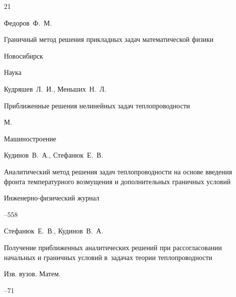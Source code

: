\begin{thebibliography}{21}

\by Федоров~Ф.~М.

\book Граничный метод решения прикладных задач математической физики

\publaddr Новосибирск

\publ Наука







\by Кудряшев~Л.~И., Меньших~Н.~Л.

\book Приближенные решения нелинейных задач теплопроводности

\publaddr М.

\publ Машиностроение






\by Кудинов~В.~А., Стефанюк~Е.~В.

\paper Аналитический метод решения задач теплопроводности на основе введения фронта температурного возмущения и дополнительных граничных условий

\jour Инженерно-физический журнал




--558







\by Стефанюк~Е.~В., Кудинов~В.~А.

\paper Получение приближенных аналитических решений при рассогласовании начальных и граничных условий в~задачах теории теплопроводности

\jour Изв. вузов. Матем.



--71





\end{thebibliography}
